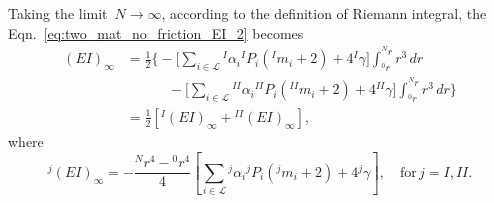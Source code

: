 \documentclass[preprint,10pt,times]{elsarticle}
\numberwithin{equation}{section}
\renewcommand{\>}{$\Rightarrow$}
\begin{document}
Taking the limit~$N \to \infty$, according to the definition of Riemann integral, the Eqn.~\eqref{eq:two_mat_no_friction_EI_2} becomes
\begin{equation}
	 \begin{aligned}
	   (EI)_{\infty} & = \frac{1}{2}  \Biggl \{
	   		- \Biggl[ \sum_{i \in \mathcal{L}} {}^{I}\!{\alpha_{i}} {}^{I}\!{P_{i}} ({}^{I}\!{m_{i}} + 2) + 4{}^{I}\!\gamma \Biggr]
			\int_{{}^{0}\!{r}}^{{}^{N}\!{r}} r^3 \, dr \\ & \quad\qquad{}
			- \Biggl[ \sum_{i \in \mathcal{L}} {}^{II}\!{\alpha_{i}} {}^{II}\!{P_{i}} ({}^{II}\!{m_{i}} + 2) + 4{}^{II}\!\gamma \Biggr]
			\int_{{}^{0}\!{r}}^{{}^{N}\!{r}} r^3 \, dr
	    \Biggl \} \\
	    & = \frac{1}{2} \left[ {}^{I}(EI)_{\infty} + {}^{II}(EI)_{\infty} \right],
	 \end{aligned}
	\label{eq:two_mat_no_friction_EI}
\end{equation}
where
\begin{equation}
	{}^{j}(EI)_{\infty} = - \frac{{}^{N}\!{r}^4 - {}^{0}\!{r}^4}{4} \left[ \sum_{i \in \mathcal{L}} {}^{j}\!{\alpha_{i}} {}^{j}\!{P_{i}} ({}^{j}\!{m_{i}} + 2 ) + 4{}^{j}\!\gamma\right], \quad \text{for} \, j = I, II.
\end{equation}


\end{document}
